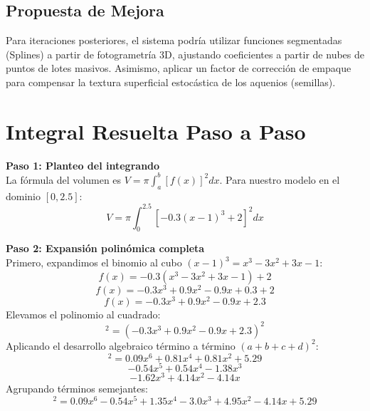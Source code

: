 \documentclass[conference, Spanish]{IEEEtran}
\begin{document}
\subsection{Propuesta de Mejora}
Para iteraciones posteriores, el sistema podría utilizar funciones segmentadas (Splines) a partir de fotogrametría 3D, ajustando coeficientes a partir de nubes de puntos de lotes masivos. Asimismo, aplicar un factor de corrección de empaque para compensar la textura superficial estocástica de los aquenios (semillas).

\section{Integral Resuelta Paso a Paso}

\textbf{Paso 1: Planteo del integrando}\\
La fórmula del volumen es $V = \pi \int_{a}^{b} [f(x)]^2 dx$. Para nuestro modelo en el dominio $[0, 2.5]$:
\begin{equation}
V = \pi \int_{0}^{2.5} \left[ -0.3(x-1)^3 + 2 \right]^2 dx
\end{equation}

\textbf{Paso 2: Expansión polinómica completa}\\
Primero, expandimos el binomio al cubo $(x-1)^3 = x^3 - 3x^2 + 3x - 1$:
\begin{equation*}
f(x) = -0.3(x^3 - 3x^2 + 3x - 1) + 2
\end{equation*}
\begin{equation*}
f(x) = -0.3x^3 + 0.9x^2 - 0.9x + 0.3 + 2
\end{equation*}
\begin{equation*}
f(x) = -0.3x^3 + 0.9x^2 - 0.9x + 2.3
\end{equation*}
Elevamos el polinomio al cuadrado:
\begin{equation*}
[f(x)]^2 = (-0.3x^3 + 0.9x^2 - 0.9x + 2.3)^2
\end{equation*}
Aplicando el desarrollo algebraico término a término $(a+b+c+d)^2$:
\begin{equation*}
[f(x)]^2 = 0.09x^6 + 0.81x^4 + 0.81x^2 + 5.29 
\end{equation*}
\begin{equation*}
- 0.54x^5 + 0.54x^4 - 1.38x^3 
\end{equation*}
\begin{equation*}
- 1.62x^3 + 4.14x^2 - 4.14x
\end{equation*}
Agrupando términos semejantes:
\begin{equation}
[f(x)]^2 = 0.09x^6 - 0.54x^5 + 1.35x^4 - 3.0x^3 + 4.95x^2 - 4.14x + 5.29
\end{equation}
\end{document}
